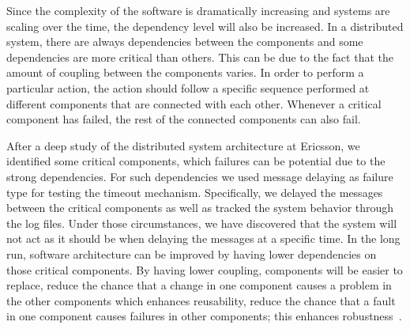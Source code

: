 Since the complexity of the software is dramatically increasing and systems are scaling over the time, the dependency level will also be increased. In a distributed system, there are always dependencies between the components and some dependencies are more critical than others. %
This can be due to the fact that the amount of coupling between the components varies. In order to perform a particular action, the action should follow a specific sequence performed at different components that are connected with each other. Whenever a critical component has failed, the rest of the connected components can also fail. 

After a deep study of the distributed system architecture at Ericsson, we identified some critical components, which failures can be potential due to the strong dependencies. For such dependencies we used message delaying as failure type for testing the timeout mechanism. %
Specifically, we delayed the messages between the critical components as well as tracked the system behavior through the log files. Under those circumstances, we have discovered that the system will not act as it should be when delaying the messages at a specific time. In the long run, software architecture can be improved by having lower dependencies on those critical components. By having lower coupling, components will be easier to replace, reduce the chance that a change in one component causes a problem in the other components which enhances reusability, reduce the chance that a fault in one component causes failures in other components; this  enhances robustness~\cite{software_arch}.  
